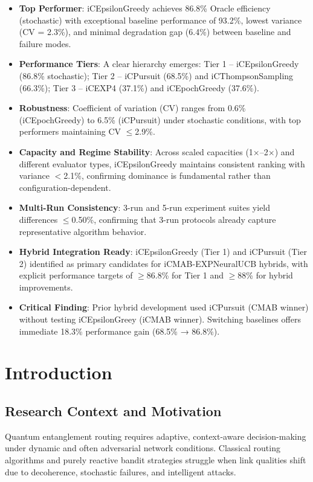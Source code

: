 \documentclass[12pt,a4paper]{article}
\newcommand{\primarytext}[1]{\textcolor{primaryblue}{\textbf{#1}}}
\newcommand{\secondarytext}[1]{\textcolor{secondaryblue}{\textbf{#1}}}
\newcommand{\success}[1]{\textcolor{accentgreen}{\textbf{#1}}}
\newcommand{\warning}[1]{\textcolor{warningred}{\textbf{#1}}}
\begin{document}
\begin{tcolorbox}[colback=highlightgray,colframe=primaryblue,title=\textbf{Executive Summary}]
\begin{itemize}
\item \primarytext{Top Performer}: iCEpsilonGreedy achieves 86.8\% Oracle efficiency (stochastic) with exceptional baseline performance of 93.2\%, lowest variance (CV = 2.3\%), and minimal degradation gap (6.4\%) between baseline and failure modes.
\item \secondarytext{Performance Tiers}: A clear hierarchy emerges: Tier 1 -- iCEpsilonGreedy (86.8\% stochastic); Tier 2 -- iCPursuit (68.5\%) and iCThompsonSampling (66.3\%); Tier 3 -- iCEXP4 (37.1\%) and iCEpochGreedy (37.6\%).
\item \success{Robustness}: Coefficient of variation (CV) ranges from 0.6\% (iCEpochGreedy) to 6.5\% (iCPursuit) under stochastic conditions, with top performers maintaining CV $\leq$2.9\%.
\item \success{Capacity and Regime Stability}: Across scaled capacities (1$\times$–2$\times$) and different evaluator types, iCEpsilonGreedy maintains consistent ranking with variance $<$2.1\%, confirming dominance is fundamental rather than configuration-dependent.
\item \success{Multi-Run Consistency}: 3-run and 5-run experiment suites yield differences $\leq$0.50\%, confirming that 3-run protocols already capture representative algorithm behavior.
\item \primarytext{Hybrid Integration Ready}: iCEpsilonGreedy (Tier 1) and iCPursuit (Tier 2) identified as primary candidates for iCMAB-EXPNeuralUCB hybrids, with explicit performance targets of $\geq$86.8\% for Tier 1 and $\geq$88\% for hybrid improvements.
\item \warning{Critical Finding}: Prior hybrid development used iCPursuit (CMAB winner) without testing iCEpsilonGreey (iCMAB winner). Switching baselines offers immediate 18.3\% performance gain (68.5\% → 86.8\%).
\end{itemize}
\end{tcolorbox}

\newpage
\section{Introduction}

\subsection{Research Context and Motivation}
Quantum entanglement routing requires adaptive, context-aware decision-making under dynamic and often adversarial network conditions. Classical routing algorithms and purely reactive bandit strategies struggle when link qualities shift due to decoherence, stochastic failures, and intelligent attacks.
\end{document}
